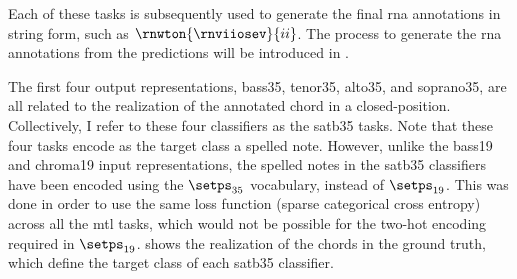 Each of these tasks is subsequently used to generate the
final \gls{rna} annotations in string form, such as
$\rnwton{\rnviiosev}{ii}$. The process to generate the
\gls{rna} annotations from the predictions will be
introduced in
. 

The first four output representations, \gls{bass35},
\gls{tenor35}, \gls{alto35}, and \gls{soprano35}, are all
related to the realization of the annotated chord in a
\gls{closed-position}. Collectively, I refer to these four
classifiers as the \gls{satb35} tasks. Note that these four
tasks encode as the target class a spelled note. However,
unlike the \gls{bass19} and \gls{chroma19} input
representations, the spelled notes in the \gls{satb35}
classifiers have been encoded using the $\setps_{35}$
vocabulary, instead of $\setps_{19}$. This was done in order
to use the same loss function (sparse categorical cross
entropy) across all the \gls{mtl} tasks, which would not be
possible for the two-hot encoding required in $\setps_{19}$.
 shows the realization of the chords in the
ground truth, which define the target class of each
\gls{satb35} classifier.

